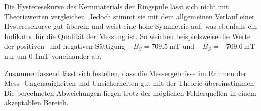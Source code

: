 Die Hysteresekurve des Kernmaterials der Ringspule lässt sich nicht mit Theoriewerten vergleichen. Jedoch stimmt sie mit dem allgemeinen Verlauf einer Hysteresekurve gut
überein und weist eine hohe Symmetrie auf, was ebenfalls ein Indikator für die Qualität der Messung ist. So weichen beispielsweise die Werte der positiven- und negativen 
Sättigung $+B_S = 709.5 \: \unit{\milli\tesla}$ und $-B_S = -709.6 \: \unit{\milli\tesla}$ nur um $0.1 \unit{\milli\tesla}$ voneinander ab. 


Zusammenfassend lässt sich festellen, dass die Messergebnisse im Rahmen der Mess- Ungenauigkeiten und Unsicherheiten gut mit der Theorie übereinstimmen. Die berechneten
Abweichungen liegen trotz der möglichen Fehlerquellen in einem akzeptablen Bereich. 
